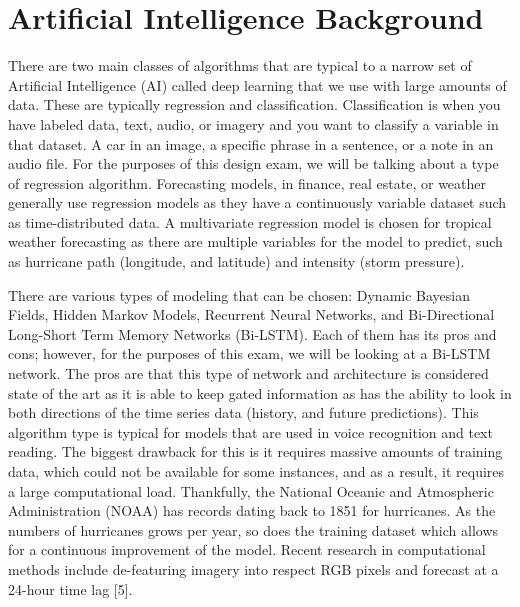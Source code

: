 \documentclass{article}
\begin{document}
\section{Artificial Intelligence Background}
There are two main classes of algorithms that are typical to a narrow set of Artificial Intelligence (AI) called deep learning that we use with large amounts of data. These are typically regression and classification. Classification is when you have labeled data, text, audio, or imagery and you want to classify a variable in that dataset. A car in an image, a specific phrase in a sentence, or a note in an audio file. For the purposes of this design exam, we will be talking about a type of regression algorithm. Forecasting models, in finance, real estate, or weather generally use regression models as they have a continuously variable dataset such as time-distributed data. A multivariate regression model is chosen for tropical weather forecasting as there are multiple variables for the model to predict, such as hurricane path (longitude, and latitude) and intensity (storm pressure). 

There are various types of modeling that can be chosen: Dynamic Bayesian Fields, Hidden Markov Models, Recurrent Neural Networks, and Bi-Directional Long-Short Term Memory Networks (Bi-LSTM). Each of them has its pros and cons; however, for the purposes of this exam, we will be looking at a Bi-LSTM network. The pros are that this type of network and architecture is considered state of the art as it is able to keep gated information as has the ability to look in both directions of the time series data (history, and future predictions). This algorithm type is typical for models that are used in voice recognition and text reading. The biggest drawback for this is it requires massive amounts of training data, which could not be available for some instances, and as a result, it requires a large computational load. Thankfully, the National Oceanic and Atmospheric Administration (NOAA) has records dating back to 1851 for hurricanes. As the numbers of hurricanes grows per year, so does the training dataset which allows for a continuous improvement of the model. Recent research in computational methods include de-featuring imagery into respect RGB pixels and forecast at a 24-hour time lag [5]. 
\end{document}
